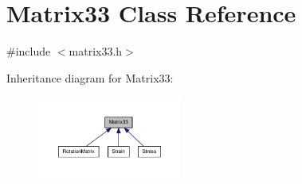 \hypertarget{classMatrix33}{\section{\-Matrix33 \-Class \-Reference}
\label{de/d82/classMatrix33}
}


{\ttfamily \#include $<$matrix33.\-h$>$}



\-Inheritance diagram for \-Matrix33\-:\nopagebreak
\begin{figure}[H]
\begin{center}
\leavevmode
\includegraphics[width=134pt]{dc/dfe/classMatrix33__inherit__graph}
\end{center}
\end{figure}
